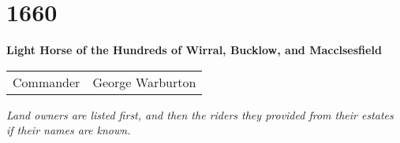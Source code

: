 \chapter*{1660}

\begin{center}
  \Large
  \textbf{Light Horse of the Hundreds of Wirral, Bucklow, and Macclsesfield}
\end{center}

\begin{center}
  \begin{tabular}{rl}
    Commander & George Warburton \\
  \end{tabular}
\end{center}

\begin{center}
  \renewcommand{\tabularxcolumn}[1]{>{\raggedleft\arraybackslash}m{#1}}
  \setlength{\extrarowheight}{.7ex}
\end{center}

\vfill

\begin{center}
  \noindent
  \it
  \small
  Land owners are listed first, and then the riders they provided from their estates if their names are known.
\end{center}
